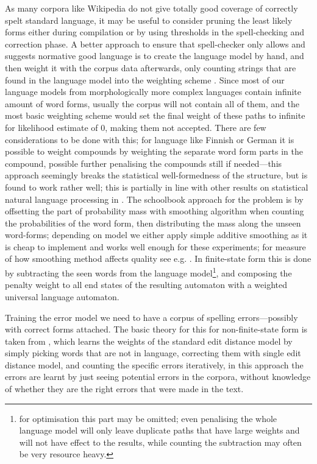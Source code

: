 \documentclass[a4paper,12pt]{article}
\begin{document}
As many corpora like Wikipedia do not give totally good coverage of correctly
spelt standard language, it may be useful to consider pruning the least likely
forms either during compilation or by using thresholds in the spell-checking
and correction phase. A better approach to ensure that spell-checker only
allows and suggests normative good language is to create the language model by
hand, and then weight it with the corpus data afterwards, only counting strings
that are found in the language model into the weighting scheme
\cite{pirinen/2009/nodalida}. Since most of our language models from
morphologically more complex languages contain infinite amount of word forms,
usually the corpus will not contain all of them, and the most basic weighting
scheme would set the final weight of these paths to infinite for likelihood
estimate of 0, making them not accepted. There are few considerations to be
done with this; for language like Finnish or German \cite{schiller2006german}
it is possible to weight compounds by weighting the separate word form parts in
the compound, possible further penalising the compounds still if needed---this
approach seemingly breaks the statistical well-formedness of the structure, but
is found to work rather well; this is partially in line with other results on
statistical natural language processing in \cite{brants2007large}. The
schoolbook approach for the problem is by offsetting the part of probability
mass with smoothing algorithm when counting the probabilities of the word form,
then distributing the mass along the unseen word-forms\cite[for a good
introduction to smoothing models we refer
to][]{jurafsky2000speech}; depending on model we either apply simple
additive smoothing as it is cheap to implement and works well enough for these
experiments; for measure of how smoothing method affects quality see e.g.
\cite{chen1999empirical}. In finite-state form this is done by subtracting the
seen words from the language model\footnote{for optimisation this part may be
    omitted; even penalising the whole language model will only leave duplicate
    paths that have large weights and will not have effect to the results,
    while counting the subtraction may often be very resource heavy.}, and
    composing the penalty weight to all end states of the resulting automaton
    with a weighted universal language automaton.

Training the error model we need to have a corpus of spelling errors---possibly
with correct forms attached. The basic theory for this for non-finite-state
form is taken from \cite{church1991probability}, which learns the weights of
the standard edit distance model by simply picking words that are not in
language, correcting them with single edit distance model, and counting the
specific errors iteratively, in this approach the errors are learnt by just
seeing potential errors in the corpora, without knowledge of whether they are
the right errors that were made in the text.
\end{document}
